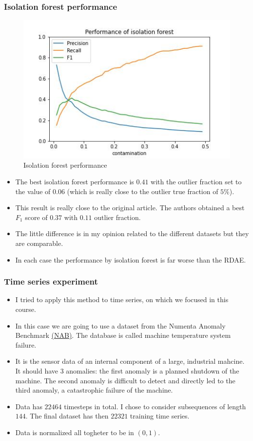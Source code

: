 \documentclass{beamer}
\theoremstyle{plain}
\theoremstyle{definition}
\theoremstyle{remark}
\begin{document}
\begin{frame}
	\frametitle{Isolation forest performance}
	\begin{figure}
		\centering
		\includegraphics[width=0.8\linewidth]{Images/isolation_forest.jpg}
		\caption[]{Isolation forest performance}
	\end{figure}
\end{frame}

\begin{frame}
	\begin{itemize}
		\item The best isolation forest performance is $0.41$ with the outlier fraction set to the value of $0.06$ (which is really close to the outlier true fraction of $5\%$).
		\item This result is really close to the original article. The authors obtained a best $F_1$ score of $0.37$ with $0.11$ outlier fraction.
		\item The little difference is in my opinion related to the different datasets but they are comparable.
		\item In each case the performance by isolation forest is far worse than the RDAE.
	\end{itemize}
\end{frame}

\begin{frame}
	\frametitle{Time series experiment}
	\begin{itemize}
		\item I tried to apply this method to time series, on which we focused in this course.
		\item In this case we are going to use a dataset from the Numenta Anomaly Benchmark \hyperref{https://github.com/numenta/NAB/tree/master/data}{}{}{(NAB)}. The database is called machine temperature system failure.
		\item It is the sensor data of an internal component of a large, industrial mahcine. It should have $3$ anomalies: the first anomaly is a planned shutdown of the machine. The second anomaly is difficult to detect and directly led to the third anomaly, a catastrophic failure of the machine.
		\item Data has $22464$ timesteps in total. I chose to consider subsequences of length $144$. The final dataset has then $22321$ training time series.
		\item Data is normalized all togheter to be in $(0,1)$.
	\end{itemize}
\end{frame}
\end{document}
